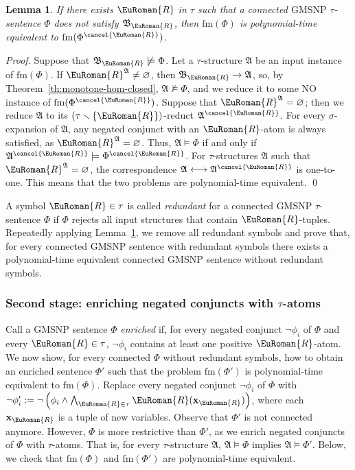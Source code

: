 \documentclass[10pt,a4paper]{amsart}
\theoremstyle{plain}
\newtheorem{lem}[thm]{Lemma}
\theoremstyle{definition}
\numberwithin{equation}{section}
\renewcommand{\proof}[1][Proof]{\par\noindent\textit{#1.}\enspace\ignorespaces}
\newcommand{\eurm}[1]{\EuRoman{#1}} %
\newcommand{\structure}[1]{\mathfrak{#1}} %
\newcommand{\tuple}[1]{\mathbf{#1}} %
\newcommand{\rel}[1]{\eurm{#1}} %
\newcommand{\Sat}[0]{\ensuremath{\mathrm{fm}}}
\newcommand{\GMSNP}[0]{\textrm{GMSNP}}
\renewcommand{\setminus}{\smallsetminus}
\begin{document}
\begin{lem}\label{lemma:neg_r_case} 
If there exists $\rel{R}$ in $\tau$ such that a connected $\GMSNP$ $\tau$-sentence $\Phi$ does not satisfy $\structure{B}_\rel{R}$, then $\Sat(\Phi)$ is polynomial-time equivalent to $\Sat(\Phi^{\cancel{\rel{R}}})$.
\end{lem}
\proof
Suppose that $\structure{B}_\rel{R}\not\models\Phi$.
Let a $\tau$-structure $\structure{A}$ be an input instance of $\Sat(\Phi)$.
If $\rel{R}^\structure{A}\not=\varnothing$, then $\structure{B}_\rel{R}\to\structure{A}$, so, by Theorem~\ref{th:monotone-hom-closed}, $\structure{A}\not\models\Phi$, and we reduce it to some NO instance of $\Sat(\Phi^{\cancel{\rel{R}}})$.
Suppose that $\rel{R}^\structure{A}=\varnothing$; then we reduce $\structure{A}$ to its $(\tau\setminus\{\rel{R}\})$-reduct $\structure{A}^{\cancel{\rel{R}}}$. For every $\sigma$-expansion of $\structure{A}$, any negated conjunct with an $\rel{R}$-atom is always satisfied, as $\rel{R}^\structure{A}=\varnothing$.
Thus, $\structure{A}\models\Phi$ if and only if $\structure{A}^{\cancel{\rel{R}}}\models\Phi^{\cancel{\rel{R}}}$. For $\tau$-structures $\structure{A}$ such that $\rel{R}^\structure{A}=\varnothing$, the correspondence $\structure{A}\longleftrightarrow\structure{A}^{\cancel{\rel{R}}}$ is one-to-one.
This means that the two problems are polynomial-time equivalent.
\qed

A symbol $\rel{R}\in\tau$ is called \emph{redundant} for a connected $\GMSNP$ $\tau$-sentence $\Phi$ if $\Phi$ rejects all input structures that contain $\rel{R}$-tuples.
Repeatedly applying Lemma~\ref{lemma:neg_r_case}, we remove all redundant symbols and prove that, for every connected $\GMSNP$ sentence with  redundant symbols there exists a polynomial-time equivalent connected $\GMSNP$ sentence without redundant symbols.

\subsubsection*{Second stage: enriching negated conjuncts with $\tau$-atoms}\label{constr:non_empty}


Call a $\GMSNP$ sentence $\Phi$ \emph{enriched} if, for every negated conjunct $\neg\phi_i$ of $\Phi$ and every $\rel{R}\in\tau$, $\neg\phi_i$ contains at least one positive $\rel{R}$-atom.
We now show, for every connected $\Phi$ without redundant symbols, how to obtain an enriched sentence $\Phi'$ such that the problem $\Sat(\Phi')$ is polynomial-time equivalent to $\Sat(\Phi)$.
Replace every negated conjunct $\neg \phi_i$ of $\Phi$ with $\neg\phi_i' := \neg\left(\phi_i\wedge \bigwedge_{\rel{R}\in\tau}\rel{R}(\tuple{x}_\rel{R})\right)$, where each $\tuple{x}_\rel{R}$ is a tuple of new variables.
Observe that $\Phi'$ is not connected anymore.
However, $\Phi$ is more restrictive than $\Phi'$, as we enrich negated conjuncts of $\Phi$ with $\tau$-atoms.
That is, for every $\tau$-structure $\structure{A}$, $\structure{A}\models\Phi$ implies $\structure{A}\models\Phi'$.
Below, we check that $\Sat(\Phi)$ and $\Sat(\Phi')$ are polynomial-time equivalent.
\end{document}
